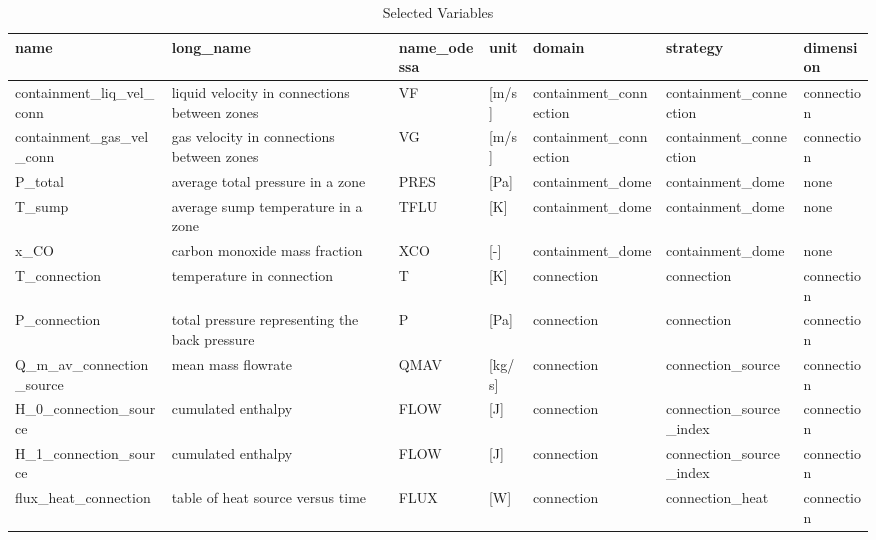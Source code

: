 \begin{table}
\caption{Selected Variables}
\label{tab:variables}
\begin{tabular}{lllllll}
\toprule
name & long_name & name_odessa & unit & domain & strategy & dimension \\
\midrule
containment_liq_vel_conn & liquid velocity in connections between zones & VF & [m/s] & containment_connection & containment_connection & connection \\
containment_gas_vel_conn & gas velocity in connections between zones & VG & [m/s] & containment_connection & containment_connection & connection \\
P_total & average total pressure in a zone & PRES & [Pa] & containment_dome & containment_dome & none \\
T_sump & average sump temperature in a zone & TFLU & [K] & containment_dome & containment_dome & none \\
x_CO & carbon monoxide mass fraction & XCO & [-] & containment_dome & containment_dome & none \\
T_connection & temperature in connection & T & [K] & connection & connection & connection \\
P_connection & total pressure representing the back pressure & P & [Pa] & connection & connection & connection \\
Q_m_av_connection_source & mean mass flowrate & QMAV & [kg/s] & connection & connection_source & connection \\
H_0_connection_source & cumulated enthalpy & FLOW & [J] & connection & connection_source_index & connection \\
H_1_connection_source & cumulated enthalpy & FLOW & [J] & connection & connection_source_index & connection \\
flux_heat_connection & table of heat source versus time & FLUX & [W] & connection & connection_heat & connection \\
\bottomrule
\end{tabular}
\end{table}
